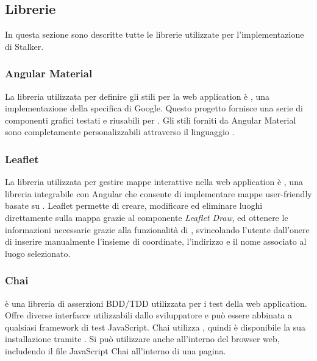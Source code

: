 \documentclass[../../../manuale-manutentore.tex]{subfiles}
\begin{document}
\subsection{Librerie}%
\label{sub:librerie}
In questa sezione sono descritte tutte le librerie utilizzate per l'implementazione di Stalker.


\subsubsection{Angular Material}%
\label{subs:angular_material}

La libreria utilizzata per definire gli stili per la web application è , una implementazione della specifica  di Google.
Questo progetto fornisce una serie di componenti grafici testati e riusabili per \@.
Gli stili forniti da Angular Material sono completamente personalizzabili attraverso il linguaggio .

\subsubsection{Leaflet}%
\label{subs:leaflet}

La libreria utilizzata per gestire mappe interattive nella web application è , una libreria integrabile con Angular che consente di implementare mappe user-friendly basate su .
Leaflet permette di creare, modificare ed eliminare luoghi direttamente sulla mappa grazie al componente \textit{Leaflet Draw}, ed ottenere le informazioni necessarie grazie alla funzionalità di , svincolando l'utente dall'onere di inserire manualmente l'insieme di coordinate, l'indirizzo e il nome associato al luogo selezionato.

\subsubsection{Chai}%
\label{subs:chai}

 è una libreria di asserzioni BDD/TDD utilizzata per i test della web application.
Offre diverse interfacce utilizzabili dallo sviluppatore e può essere abbinata a qualsiasi framework di test JavaScript.
Chai utilizza , quindi è disponibile la sua installazione tramite .
Si può utilizzare anche all'interno del browser web, includendo il file JavaScript Chai all'interno di una pagina.
\end{document}
